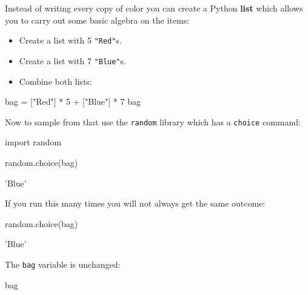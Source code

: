 Instead of writing every copy of color you can create a Python \textbf{list} which allows
you to carry out some basic algebra on the items:
\begin{itemize}
\item 

Create a list with 5 \texttt{"Red"}s.

\item 

Create a list with 7 \texttt{"Blue"}s.

\item 

Combine both lists:

\end{itemize}




\begin{pyin}
bag = ["Red"] * 5 + ["Blue"] * 7
bag
\end{pyin}





\begin{raw}
\end{raw}

Now to sample from that use the \texttt{random} library which has a \texttt{choice}
command:

\begin{pyin}
import random

random.choice(bag)
\end{pyin}





\begin{raw}
'Blue'
\end{raw}

If you run this many times you will not always get the same outcome:

\begin{pyin}
random.choice(bag)
\end{pyin}





\begin{pyin}
'Blue'
\end{pyin}

The \texttt{bag} variable is unchanged:

\begin{pyin}
bag
\end{pyin}

